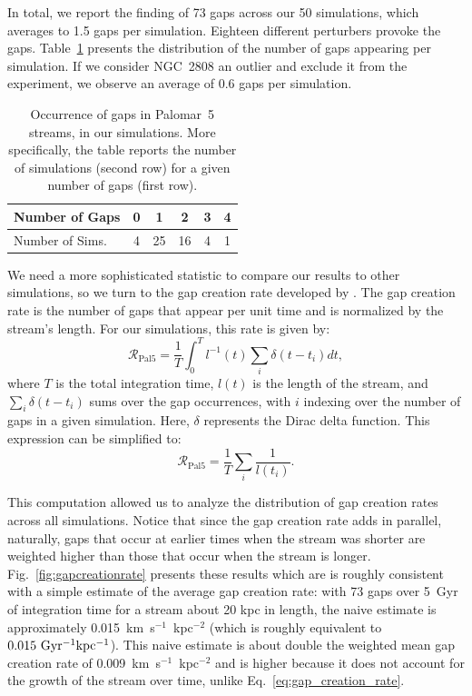         In total, we report the finding of 73 gaps across our 50 simulations, which averages to 1.5 gaps per simulation. Eighteen different perturbers provoke the gaps. Table~\ref{table:gap_distribution} presents the distribution of the number of gaps appearing per simulation. If we consider NGC~2808 an outlier and exclude it from the experiment, we observe an average of 0.6 gaps per simulation.  

        \begin{table}[h]
            \centering
            \caption{Occurrence of gaps in Palomar~5 streams, in our simulations. More specifically, the table reports the number of simulations (second row) for a given number of gaps (first row).}\label{table:gap_distribution}
            \begin{tabular}{|l|c|c|c|c|c|}
                \hline
                Number of Gaps & 0 & 1 & 2 & 3 & 4 \\
                \hline
                Number of Sims. & 4 & 25 & 16 & 4 & 1 \\
                \hline
            \end{tabular}
            \vspace{0.5cm}
        \end{table}

        We need a more sophisticated statistic to compare our results to other simulations, so we turn to the gap creation rate developed by \citet{2012ApJ...748...20C}. The gap creation rate is the number of gaps that appear per unit time and is normalized by the stream's length. For our simulations, this rate is given by: \begin{equation} \label{eq:gap_creation_rate} \mathcal{R}_{\mathrm{Pal 5}} =  \frac{1}{T}\int_{0}^T l^{-1}(t) \sum_i \delta(t-t_i) dt,\end{equation}where $T$ is the total integration time, $l(t)$ is the length of the stream, and $\sum_i \delta(t-t_i)$ sums over the gap occurrences, with $i$ indexing over the number of gaps in a given simulation. Here, $\delta$ represents the Dirac delta function. This expression can be simplified to:\begin{equation}\mathcal{R}_{\mathrm{Pal 5}} =  \frac{1}{T} \sum_i \frac{1}{l (t_i)}. \end{equation}
        
        This computation allowed us to analyze the distribution of gap creation rates across all simulations. Notice that since the gap creation rate adds in parallel, naturally, gaps that occur at earlier times when the stream was shorter are weighted higher than those that occur when the stream is longer. Fig.~\ref{fig:gapcreationrate} presents these results which are is roughly consistent with a simple estimate of the average gap creation rate: with 73 gaps over 5~Gyr of integration time for a stream about 20 kpc in length, the naive estimate is approximately 0.015~km~s$^{-1}$~kpc$^{-2} $ (which is roughly equivalent to $0.015~\rm{Gyr^{-1}kpc^{-1}}$). This naive estimate is about double the weighted mean gap creation rate of 0.009~km~s$^{-1}$~kpc$^{-2}$ and is higher because it does not account for the growth of the stream over time, unlike Eq.~\ref{eq:gap_creation_rate}.

